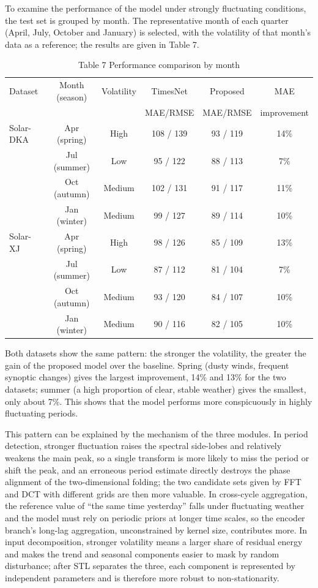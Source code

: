 \documentclass{iopjournal}
\begin{document}
To examine the performance of the model under strongly fluctuating conditions, the test set is grouped by month. The representative month of each quarter (April, July, October and January) is selected, with the volatility of that month's data as a reference; the results are given in Table 7.

\begin{table}[htbp]
\caption{Table 7  Performance comparison by month}
\centering
\small
\setlength{\tabcolsep}{4pt}
\begin{tabular}{l c c c c c}
\hline
Dataset & Month (season) & Volatility & TimesNet & Proposed & MAE \\
 &  &  & MAE/RMSE & MAE/RMSE & improvement \\
\hline
Solar-DKA & Apr (spring) & High & 108 / 139 & 93 / 119 & 14\% \\
 & Jul (summer) & Low & 95 / 122 & 88 / 113 & 7\% \\
 & Oct (autumn) & Medium & 102 / 131 & 91 / 117 & 11\% \\
 & Jan (winter) & Medium & 99 / 127 & 89 / 114 & 10\% \\
Solar-XJ & Apr (spring) & High & 98 / 126 & 85 / 109 & 13\% \\
 & Jul (summer) & Low & 87 / 112 & 81 / 104 & 7\% \\
 & Oct (autumn) & Medium & 93 / 120 & 84 / 107 & 10\% \\
 & Jan (winter) & Medium & 90 / 116 & 82 / 105 & 10\% \\
\hline
\end{tabular}
\label{tab7}
\end{table}

Both datasets show the same pattern: the stronger the volatility, the greater the gain of the proposed model over the baseline. Spring (dusty winds, frequent synoptic changes) gives the largest improvement, 14\% and 13\% for the two datasets; summer (a high proportion of clear, stable weather) gives the smallest, only about 7\%. This shows that the model performs more conspicuously in highly fluctuating periods.

This pattern can be explained by the mechanism of the three modules. In period detection, stronger fluctuation raises the spectral side-lobes and relatively weakens the main peak, so a single transform is more likely to miss the period or shift the peak, and an erroneous period estimate directly destroys the phase alignment of the two-dimensional folding; the two candidate sets given by FFT and DCT with different grids are then more valuable. In cross-cycle aggregation, the reference value of ``the same time yesterday'' falls under fluctuating weather and the model must rely on periodic priors at longer time scales, so the encoder branch's long-lag aggregation, unconstrained by kernel size, contributes more. In input decomposition, stronger volatility means a larger share of residual energy and makes the trend and seasonal components easier to mask by random disturbance; after STL separates the three, each component is represented by independent parameters and is therefore more robust to non-stationarity.
\end{document}
